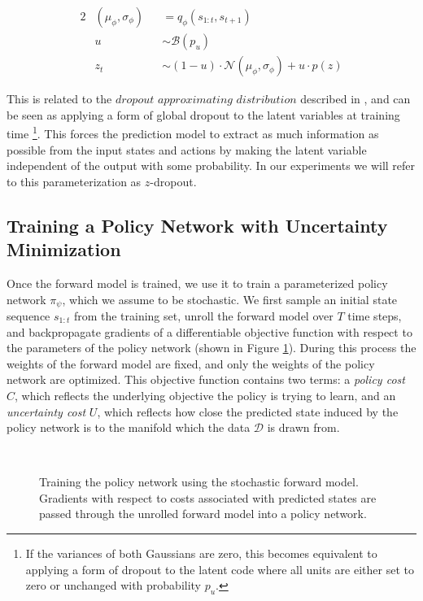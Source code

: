 \documentclass{article} %
\begin{document}
\begin{alignat*}{2}
  \label{eq:update-eqn}
  &(\mu_\phi, \sigma_\phi) &&= q_\phi(s_{1:t}, s_{t+1}) \\
  &u &&\sim \mathcal{B}(p_u) \\
  &z_t &&\sim (1-u) \cdot \mathcal{N}(\mu_\phi, \sigma_\phi) + u \cdot p(z)
\end{alignat*}

This is related to the $\textit{dropout approximating distribution}$ described in \citep{Gal16}, and can be seen as applying a form of global dropout to the latent variables at training time \footnote{If the variances of both Gaussians are zero, this becomes equivalent to applying a form of dropout to the latent code where all units are either set to zero or unchanged with probability $p_u$.}.
This forces the prediction model to extract as much information as possible from the input states and actions by making the latent variable independent of the output with some probability. In our experiments we will refer to this parameterization as $z$-dropout.


\subsection{Training a Policy Network with Uncertainty Minimization}
\label{uncertainty-minimization}

Once the forward model is trained, we use it to train a parameterized policy network $\pi_\psi$, which we assume to be stochastic.
We first sample an initial state sequence $s_{1:t}$ from the training set, unroll the forward model over $T$ time steps, and backpropagate gradients of a differentiable objective function with respect to the parameters of the policy network (shown in Figure \ref{svg}). 
During this process the weights of the forward model are fixed, and only the weights of the policy network are optimized.
This objective function contains two terms: a \textit{policy cost} $C$, which reflects the underlying objective the policy is trying to learn, and an \textit{uncertainty cost} $U$, which reflects how close the predicted state induced by the policy network is to the manifold which the data $\mathcal{D}$ is drawn from.

\begin{figure}[t!]
    \centering
     \\
    \caption{Training the policy network using the stochastic forward model. Gradients with respect to costs associated with predicted states are passed through the unrolled forward model into a policy network.}
    \label{svg}
\end{figure}
\end{document}
